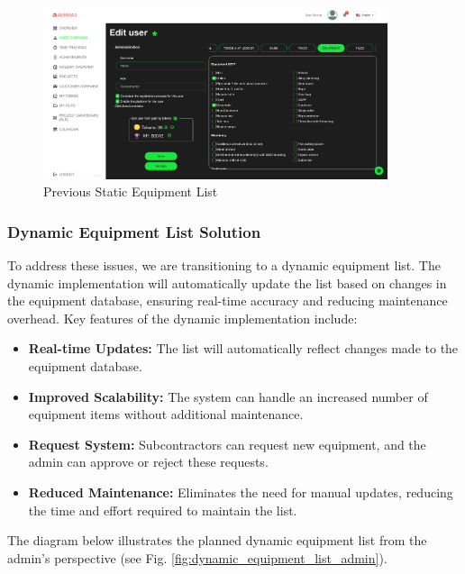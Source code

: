    \begin{figure}[H]
        \centering
        \includegraphics[width=0.9\textwidth]{src/assets/chapters/StaticDynamicEquipementList.png}
        \caption{Previous Static Equipment List}
        \label{fig:static_equipment_list}
    \end{figure}
    
    \subsubsection{Dynamic Equipment List Solution}
    To address these issues, we are transitioning to a dynamic equipment list. The dynamic implementation will automatically update the list based on changes in the equipment database, ensuring real-time accuracy and reducing maintenance overhead. Key features of the dynamic implementation include:
    \begin{itemize}
        \item \textbf{Real-time Updates:} The list will automatically reflect changes made to the equipment database.
        \item \textbf{Improved Scalability:} The system can handle an increased number of equipment items without additional maintenance.
        \item \textbf{Request System:} Subcontractors can request new equipment, and the admin can approve or reject these requests.
        \item \textbf{Reduced Maintenance:} Eliminates the need for manual updates, reducing the time and effort required to maintain the list.
    \end{itemize}
    
    The diagram below illustrates the planned dynamic equipment list from the admin's perspective (see Fig. \ref{fig:dynamic_equipment_list_admin}).

